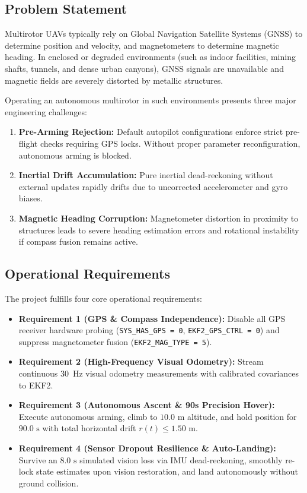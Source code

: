 \documentclass[11pt,a4paper]{article}
\begin{document}
\subsection{Problem Statement}
Multirotor UAVs typically rely on Global Navigation Satellite Systems (GNSS) to determine position and velocity, and magnetometers to determine magnetic heading. In enclosed or degraded environments (such as indoor facilities, mining shafts, tunnels, and dense urban canyons), GNSS signals are unavailable and magnetic fields are severely distorted by metallic structures.

Operating an autonomous multirotor in such environments presents three major engineering challenges:
\begin{enumerate}[leftmargin=1.5em, itemsep=2pt]
  \item \textbf{Pre-Arming Rejection:} Default autopilot configurations enforce strict pre-flight checks requiring GPS locks. Without proper parameter reconfiguration, autonomous arming is blocked.
  \item \textbf{Inertial Drift Accumulation:} Pure inertial dead-reckoning without external updates rapidly drifts due to uncorrected accelerometer and gyro biases.
  \item \textbf{Magnetic Heading Corruption:} Magnetometer distortion in proximity to structures leads to severe heading estimation errors and rotational instability if compass fusion remains active.
\end{enumerate}

\subsection{Operational Requirements}
The project fulfills four core operational requirements:

\begin{metricbox}
\begin{itemize}[leftmargin=1.2em, itemsep=3pt]
  \item \textbf{Requirement 1 (GPS \& Compass Independence):} Disable all GPS receiver hardware probing (\texttt{SYS\_HAS\_GPS = 0}, \texttt{EKF2\_GPS\_CTRL = 0}) and suppress magnetometer fusion (\texttt{EKF2\_MAG\_TYPE = 5}).
  \item \textbf{Requirement 2 (High-Frequency Visual Odometry):} Stream continuous 30~Hz visual odometry measurements with calibrated covariances to EKF2.
  \item \textbf{Requirement 3 (Autonomous Ascent \& 90s Precision Hover):} Execute autonomous arming, climb to $10.0\text{ m}$ altitude, and hold position for $90.0\text{ s}$ with total horizontal drift $r(t) \le 1.50\text{ m}$.
  \item \textbf{Requirement 4 (Sensor Dropout Resilience \& Auto-Landing):} Survive an $8.0\text{ s}$ simulated vision loss via IMU dead-reckoning, smoothly re-lock state estimates upon vision restoration, and land autonomously without ground collision.
\end{itemize}
\end{metricbox}
\end{document}
